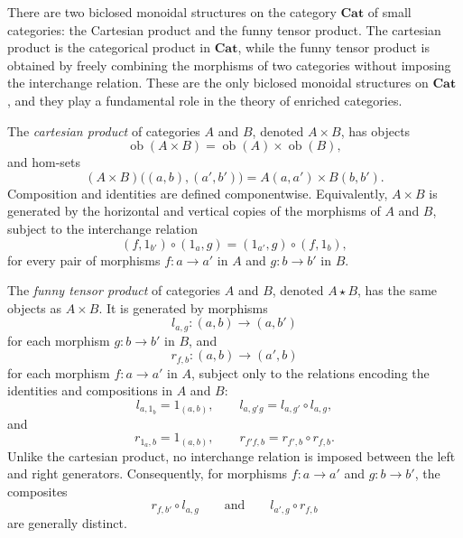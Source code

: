 \documentclass{tac}
\begin{document}
There are two biclosed monoidal structures on the category
$\mathbf{Cat}$ of small categories: the Cartesian product and the funny
tensor product. The cartesian product is the categorical product in
$\mathbf{Cat}$, while the funny tensor product is obtained by freely
combining the morphisms of two categories without imposing the
interchange relation. These are the only biclosed monoidal structures on
$\mathbf{Cat}$ \cite{FoltzLairKelly1980}, and they play a fundamental
role in the theory of enriched categories.

The \emph{cartesian product} of categories $A$ and $B$, denoted
$A\times B$, has objects
\[
\operatorname{ob}(A\times B)
=
\operatorname{ob}(A)\times\operatorname{ob}(B),
\]
and hom-sets
\[
(A\times B)\bigl((a,b),(a',b')\bigr)
=
A(a,a')\times B(b,b').
\]
Composition and identities are defined componentwise. Equivalently,
$A\times B$ is generated by the horizontal and vertical copies of the
morphisms of $A$ and $B$, subject to the interchange relation
\[
(f,1_{b'})\circ(1_a,g)
=
(1_{a'},g)\circ(f,1_b),
\]
for every pair of morphisms $f:a\to a'$ in $A$ and
$g:b\to b'$ in $B$.

The \emph{funny tensor product} of categories $A$ and $B$, denoted
$A\star B$, has the same objects as $A\times B$. It is generated by
morphisms
\[
l_{a,g}:(a,b)\longrightarrow(a,b')
\]
for each morphism $g:b\to b'$ in $B$, and
\[
r_{f,b}:(a,b)\longrightarrow(a',b)
\]
for each morphism $f:a\to a'$ in $A$, subject only to the relations
encoding the identities and compositions in $A$ and $B$:
\[
l_{a,1_b}=1_{(a,b)},
\qquad
l_{a,g'g}=l_{a,g'}\circ l_{a,g},
\]
and
\[
r_{1_a,b}=1_{(a,b)},
\qquad
r_{f'f,b}=r_{f',b}\circ r_{f,b}.
\]
Unlike the cartesian product, no interchange relation is imposed between
the left and right generators. Consequently, for morphisms
$f:a\to a'$ and $g:b\to b'$, the composites
\[
r_{f,b'}\circ l_{a,g}
\qquad\text{and}\qquad
l_{a',g}\circ r_{f,b}
\]
are generally distinct.
\end{document}

